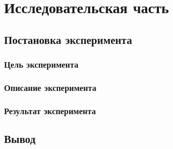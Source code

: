 \chapter{Исследовательская часть}

\section{Постановка эксперимента}

\subsection{Цель эксперимента}

\subsection{Описание эксперимента}

\subsection{Результат эксперимента}

\section*{Вывод}
